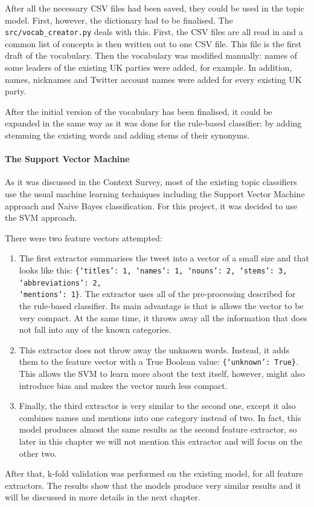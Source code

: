After all the necessary CSV files had been saved, they could be used in the topic model. First, however, the dictionary had to be finalised. The \texttt{src/vocab\_creator.py} deals with this. First, the CSV files are all read in and a common list of concepts is then written out to one CSV file. This file is the first draft of the vocabulary. Then the vocabulary was modified manually: names of some leaders of the existing UK parties were added, for example. In addition, names, nicknames and Twitter account names were added for every existing UK party. 

After the initial version of the vocabulary has been finalised, it could be expanded in the same way as it was done for the rule-based classifier: by adding stemming the existing words and adding stems of their synonyms.

\paragraph{The Support Vector Machine}
As it was discussed in the Context Survey, most of the existing topic classifiers use the usual machine learning techniques including the Support Vector Machine approach and Naive Bayes classification. For this project, it was decided to use the SVM approach. 

There were two feature vectors attempted:
\begin{enumerate}
    \item The first extractor summarises the tweet into a vector of a small size and that looks like this: \texttt{\{`titles': 1, `names': 1, `nouns': 2, `stems': 3, `abbreviations': 2,\\ `mentions': 1\}}. The extractor uses all of the pre-processing described for the rule-based classifier. Its main advantage is that is allows the vector to be very compact. At the same time, it throws away all the information that does not fall into any of the known categories. 
    \item This extractor does not throw away the unknown words. Instead, it adds them to the feature vector with a True Boolean value: \texttt{\{`unknown': True\}}. This allows the SVM to learn more about the text itself, however, might also introduce bias and makes the vector much less compact.
    \item Finally, the third extractor is very similar to the second one, except it also combines names and mentions into one category instead of two. In fact, this model produces almost the same results as the second feature extractor, so later in this chapter we will not mention this extractor and will focus on the other two.
\end{enumerate}

After that, k-fold validation was performed on the existing model, for all feature extractors. The results show that the models produce very similar results and it will be discussed in more details in the next chapter.


